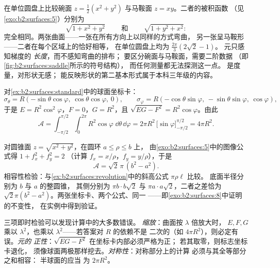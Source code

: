 \begin{example}\label{ex:b2:surfaces:samearea}
在单位圆盘上比较碗面 $z = \frac12(x^2 + y^2)$
与马鞍面 $z = xy$。二者的被积函数
（见\cref{exo:b2:surfaces:5}）分别为
\[
\sqrt{1 + x^2 + y^2}
\qquad\text{ 和 }\qquad
\sqrt{1 + y^2 + x^2} :
\]
完全相同。两张曲面——一张在所有方向上以同样的方式弯曲，
另一张呈马鞍形——二者在每个区域上的恰好相等，
在单位圆盘上均为 $\frac{2\pi}3(2\sqrt2 - 1)$。
元只感知梯度的
\emph{长度}，而不感知弯曲的排布；
要区分碗面与马鞍面，需要二阶数据
（即\cref{fig:b2:surfaces:saddle}所示的符号结构），
而任何测量都无法探测这一点。
是度量，对形状无感；
能反映形状的第二基本形式属于本科三年级的内容。
\end{example}

\begin{example}[球面的面积]\label{ex:b2:surfaces:spherearea}
对\cref{ex:b2:surfaces:standard}中的球面坐标卡：
\[
\sigma_\theta = R(-\sin\theta\cos\varphi,\
\cos\theta\cos\varphi,\ 0),
\qquad
\sigma_\varphi = R(-\cos\theta\sin\varphi,\
-\sin\theta\sin\varphi,\ \cos\varphi),
\]
于是 $E = R^2\cos^2\varphi$，$F = 0$，$G = R^2$，且 $\sqrt{EG - F^2}
= R^2\cos\varphi$。由此
\[
\mathcal{A}
= \int_{-\pi/2}^{\pi/2}\!\!\int_0^{2\pi}
R^2\cos\varphi\;\dd\theta\,\dd\varphi
= 2\pi R^2\,\bigl[\sin\varphi\bigr]_{-\pi/2}^{\pi/2}
= \boxed{4\pi R^2} .
\]
\end{example}

\begin{example}[圆锥，
与中学公式核对]\label{ex:b2:surfaces:conearea}
对圆锥面 $z = \sqrt{x^2 + y^2}$，在圆环 $a \leq
\rho \leq b$ 上，
由\cref{exo:b2:surfaces:5}中的图像公式得 $1 + f_x^2 + f_y^2 = 2$
（计算 $f_x = x/\rho$，$f_y = y/\rho$），于是
\[
\mathcal A = \sqrt2\,\pi\,(b^2 - a^2) .
\]
相容性检验：与\cref{ex:b2:surfaces:revolution}中的斜高公式 $\pi\rho\ell$ 比较。
底面半径分别为 $b$ 与 $a$ 的整圆锥，
其侧分别为 $\pi b\cdot b\sqrt2$ 与
$\pi a\cdot a\sqrt2$，二者之差恰为
$\sqrt2\pi(b^2 - a^2)$。两张坐标卡、两个公式、同一\omterm{def:b2:surfaces:area}{面积}
——即\cref{exo:b2:surfaces:8}中证明的不变性，
在实例中得到验证。
\end{example}

\begin{remark}[曲面面积的快速检验]
三项即时检验可以发现计算中的大多数错误。
\emph{缩放}：曲面按 $\lambda$ 倍放大时，
$E, F, G$ 乘以 $\lambda^2$，也乘以
$\lambda^2$——若答案对 $R$ 的依赖不是
二次的（如 $4\pi R^2$），则必定有误。\emph{元的
正性}：$\sqrt{EG - F^2}$ 在坐标卡内部必须严格为正；
若其取零，则标志坐标卡退化，
须像球面两极那样挖去。\emph{对称性}：对称部分上的计算
必须与其全等部分之和相容：
半球面的应当
为 $2\pi R^2$。
\end{remark}

